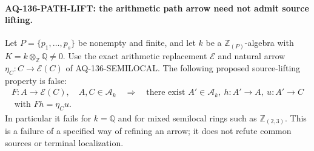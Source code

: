 \paragraph{AQ-136-PATH-LIFT: the arithmetic path arrow need not admit source lifting.}
Let $P=\{p_1,\ldots,p_s\}$ be nonempty and finite, and let $k$
be a $\mathbb Z_{(P)}$-algebra with
$K=k\otimes_{\mathbb Z}\mathbb Q\ne0$.
Use the exact arithmetic replacement $\mathcal E$ and natural
arrow $\eta_C:C\to\mathcal E(C)$ of AQ-136-SEMILOCAL.
The following proposed source-lifting property is false:
\[
 \begin{gathered}
 F:A\longrightarrow\mathcal E(C),\quad A,C\in\mathcal A_k
 \quad\Longrightarrow\quad
 \text{there exist }A'\in\mathcal A_k,\ h:A'\to A,\ u:A'\to C\\
 \text{ with }Fh=\eta_Cu.
 \end{gathered}                                             \tag{136.PL1}
\]
In particular it fails for $k=\mathbb Q$ and for mixed semilocal
rings such as $\mathbb Z_{(2,3)}$.
This is a failure of a specified way of refining an arrow;
it does not refute common sources or terminal localization.

